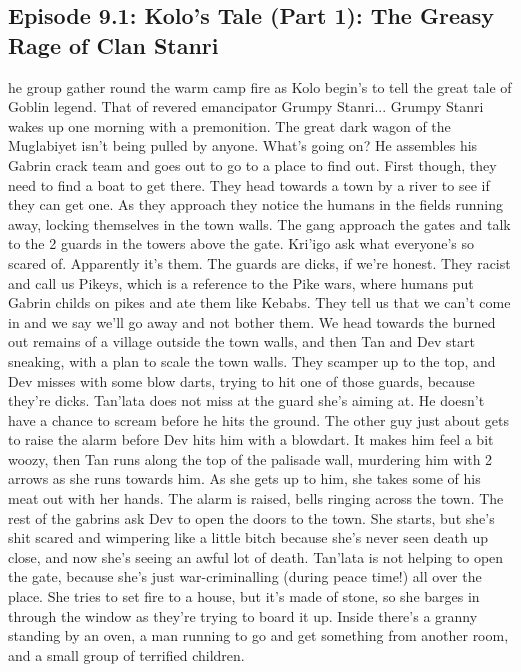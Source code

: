 \subsection{Episode 9.1: Kolo's Tale (Part 1): The Greasy Rage of Clan Stanri }
he group gather round the warm camp fire as Kolo begin's to tell the great tale of Goblin legend. That of revered emancipator Grumpy Stanri...\medskip
Grumpy Stanri wakes up one morning with a premonition. The great dark wagon of the Muglabiyet isn’t being pulled by anyone. What’s going on? He assembles his Gabrin crack team and goes out to go to a place to find out.\medskip
First though, they need to find a boat to get there. They head towards a town by a river to see if they can get one.\medskip
As they approach they notice the humans in the fields running away, locking themselves in the town walls.\medskip
The gang approach the gates and talk to the 2 guards in the towers above the gate. Kri'igo ask what everyone’s so scared of. Apparently it’s them. The guards are dicks, if we’re honest. They racist and call us Pikeys, which is a reference to the Pike wars, where humans put Gabrin childs on pikes and ate them like Kebabs.\medskip
They tell us that we can’t come in and we say we’ll go away and not bother them. We head towards the burned out remains of a village outside the town walls, and then Tan and Dev start sneaking, with a plan to scale the town walls.\medskip
They scamper up to the top, and Dev misses with some blow darts, trying to hit one of those guards, because they’re dicks.\medskip
Tan’lata does not miss at the guard she’s aiming at. He doesn’t have a chance to scream before he hits the ground.\medskip
The other guy just about gets to raise the alarm before Dev hits him with a blowdart. It makes him feel a bit woozy, then Tan runs along the top of the palisade wall, murdering him with 2 arrows as she runs towards him. As she gets up to him, she takes some of his meat out with her hands.\medskip
The alarm is raised, bells ringing across the town.\medskip
The rest of the gabrins ask Dev to open the doors to the town. She starts, but she’s shit scared and wimpering like a little bitch because she’s never seen death up close, and now she’s seeing an awful lot of death.\medskip
Tan’lata is not helping to open the gate, because she’s just war-criminalling (during peace time!) all over the place. She tries to set fire to a house, but it’s made of stone, so she barges in through the window as they’re trying to board it up.\medskip
Inside there's a granny standing by an oven, a man running to go and get something from another room, and a small group of terrified children.\medskip
